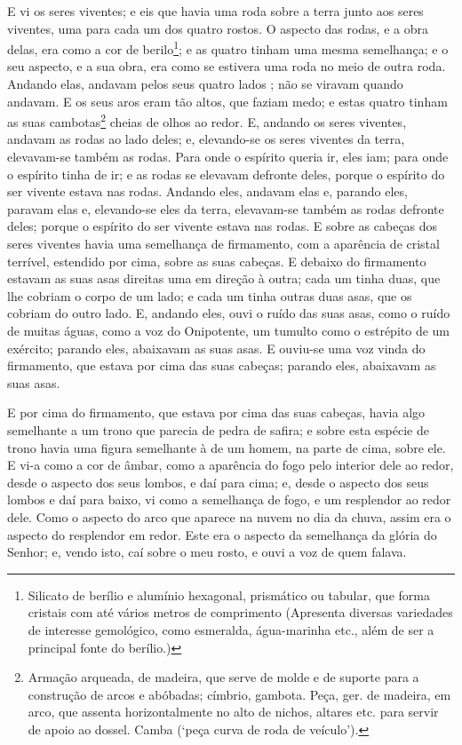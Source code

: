 E vi os seres viventes; e eis que havia uma roda sobre a terra
junto aos seres viventes, uma para cada um dos quatro rostos.
O aspecto das rodas, e a obra delas, era como a cor de
berilo\footnote{Silicato de berílio e alumínio hexagonal, prismático
ou tabular, que forma cristais com até vários metros de comprimento
(Apresenta diversas variedades de interesse gemológico, como
esmeralda, água-marinha etc., além de ser a principal fonte do
berílio.)}; e as quatro tinham uma mesma semelhança; e o seu
aspecto, e a sua obra, era como se estivera uma roda no meio de
outra roda. Andando elas, andavam pelos seus quatro lados ;
não se viravam quando andavam. E os seus aros eram tão altos,
que faziam medo; e estas quatro tinham as suas
cambotas\footnote{Armação arqueada, de madeira, que serve de molde e
de suporte para a construção de arcos e abóbadas; címbrio, gambota.
Peça, ger. de madeira, em arco, que assenta horizontalmente no alto
de nichos, altares etc. para servir de apoio ao dossel. Camba (`peça
curva de roda de veículo').} cheias de olhos ao redor. E,
andando os seres viventes, andavam as rodas ao lado deles; e,
elevando-se os seres viventes da terra, elevavam-se também as rodas.
Para onde o espírito queria ir, eles iam; para onde o
espírito tinha de ir; e as rodas se elevavam defronte deles, porque
o espírito do ser vivente estava nas rodas. Andando eles,
andavam elas e, parando eles, paravam elas e, elevando-se eles da
terra, elevavam-se também as rodas defronte deles; porque o espírito
do ser vivente estava nas rodas. E sobre as cabeças dos seres
viventes havia uma semelhança de firmamento, com a aparência de
cristal terrível, estendido por cima, sobre as suas cabeças.
E debaixo do firmamento estavam as suas asas direitas uma em
direção à outra; cada um tinha duas, que lhe cobriam o corpo de um
lado; e cada um tinha outras duas asas, que os cobriam do outro
lado. E, andando eles, ouvi o ruído das suas asas, como o
ruído de muitas águas, como a voz do Onipotente, um tumulto como o
estrépito de um exército; parando eles, abaixavam as suas asas.
E ouviu-se uma voz vinda do firmamento, que estava por cima
das suas cabeças; parando eles, abaixavam as suas asas.

E por cima do firmamento, que estava por cima das suas cabeças,
havia algo semelhante a um trono que parecia de pedra de safira; e
sobre esta espécie de trono havia uma figura semelhante à de um
homem, na parte de cima, sobre ele. E vi-a como a cor de
âmbar, como a aparência do fogo pelo interior dele ao redor, desde o
aspecto dos seus lombos, e daí para cima; e, desde o aspecto dos
seus lombos e daí para baixo, vi como a semelhança de fogo, e um
resplendor ao redor dele. Como o aspecto do arco que aparece
na nuvem no dia da chuva, assim era o aspecto do resplendor em
redor. Este era o aspecto da semelhança da glória do Senhor; e,
vendo isto, caí sobre o meu rosto, e ouvi a voz de quem falava.

